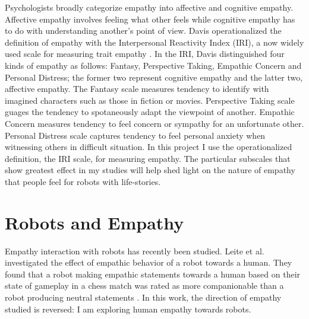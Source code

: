 

Psychologists broadly categorize empathy into affective and cognitive empathy. Affective empathy involves feeling what other feels while cognitive empathy has to do with understanding another's point of view. Davis operationalized the definition of empathy with the Interpersonal Reactivity Index (IRI), a now widely used scale for measuring trait empathy \cite{davis_multidimensional_empathy}. In the IRI, Davis distinguished four kinds of empathy as follows: Fantasy, Perspective Taking, Empathic Concern and Personal Distress; the former two represent cognitive empathy and the latter two, affective empathy. The Fantasy scale measures tendency to identify with imagined characters such as those in fiction or movies. Perspective Taking scale guages the tendency to spotaneously adapt the viewpoint of another. Empathic Concern measures tendency to feel concern or sympathy for an unfortunate other. Personal Distress scale captures tendency to feel personal anxiety when witnessing others in difficult situation. In this project I use the operationalized definition, the IRI scale, for measuring empathy. The particular subscales that show greatest effect in my studies will help shed light on the nature of empathy that people feel for robots with life-stories. 




\section{Robots and Empathy}


Empathy interaction with robots has recently been studied. Leite et al. investigated the effect of empathic behavior of a robot towards a human. They found that a robot making empathic statements towards a human based on their state of gameplay in a chess match was rated as more companionable than a robot producing neutral statements \cite{leite_empathic_chess_robot}. In this work, the direction of empathy studied is reversed: I am exploring human empathy towards robots. 

